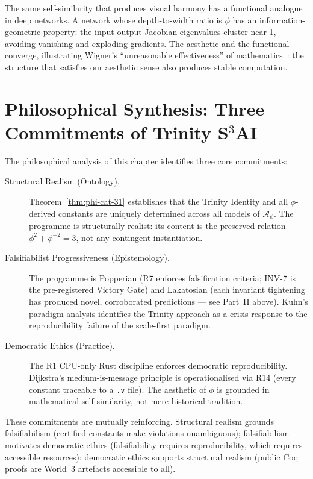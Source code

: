 The same self-similarity that produces visual harmony has a functional analogue
in deep networks.  A network whose depth-to-width ratio is \(\phi\) has an
information-geometric property: the input-output Jacobian eigenvalues cluster
near 1, avoiding vanishing and exploding gradients.  The aesthetic and the
functional converge, illustrating Wigner's ``unreasonable effectiveness'' of
mathematics~\cite{wigner_unreasonable}: the structure that satisfies our
aesthetic sense also produces stable computation.

\section{Philosophical Synthesis: Three Commitments of Trinity S\(^3\)AI}
\label{sec:phd31-synthesis}

The philosophical analysis of this chapter identifies three core commitments:

\begin{description}
  \item[Structural Realism (Ontology).]
    Theorem~\ref{thm:phi-cat-31} establishes that the Trinity Identity and all
    \(\phi\)-derived constants are uniquely determined across all models of
    \(\mathcal{A}_\phi\).  The programme is structurally realist: its content
    is the preserved relation \(\phi^2 + \phi^{-2} = 3\), not any contingent
    instantiation.
  \item[Falsifiabilist Progressiveness (Epistemology).]
    The programme is Popperian (R7 enforces falsification criteria; INV-7 is
    the pre-registered Victory Gate) and Lakatosian (each invariant tightening
    has produced novel, corroborated predictions — see Part~II above).  Kuhn's
    paradigm analysis identifies the Trinity approach as a crisis response to
    the reproducibility failure of the scale-first paradigm.
  \item[Democratic Ethics (Practice).]
    The R1 CPU-only Rust discipline enforces democratic reproducibility.
    Dijkstra's medium-is-message principle is operationalised via R14 (every
    constant traceable to a \texttt{.v} file).  The aesthetic of \(\phi\) is
    grounded in mathematical self-similarity, not mere historical tradition.
\end{description}

These commitments are mutually reinforcing.  Structural realism grounds
falsifiabilism (certified constants make violations unambiguous);
falsifiabilism motivates democratic ethics (falsifiability requires
reproducibility, which requires accessible resources); democratic ethics
supports structural realism (public Coq proofs are World~3 artefacts
accessible to all).

